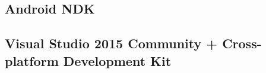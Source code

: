		
		
		\subsection{Android NDK}
		\label{t:technologie:narzedzia:ndk}
		
		
		\subsection{Visual Studio 2015 Community + Cross-platform Development Kit}
		\label{t:technologie:narzedzia:vs}
		
		
		
